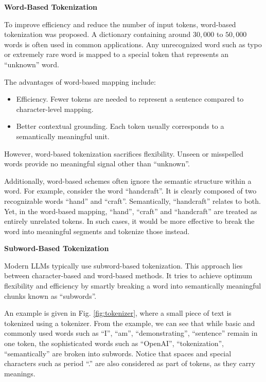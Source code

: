\vspace{0.1in}
\noindent \textbf{Word-Based Tokenization}
\vspace{0.1in}

To improve efficiency and reduce the number of input tokens, word-based tokenization was proposed. A dictionary containing around $30{,}000$ to $50{,}000$ words is often used in common applications. Any unrecognized word such as typo or extremely rare word is mapped to a special token that represents an ``unknown'' word.

The advantages of word-based mapping include:
\begin{itemize}
	\item Efficiency. Fewer tokens are needed to represent a sentence compared to character-level mapping.
	\item Better contextual grounding. Each token usually corresponds to a semantically meaningful unit.
\end{itemize}

However, word-based tokenization sacrifices flexibility. Unseen or misspelled words provide no meaningful signal other than ``unknown''. 

Additionally, word-based schemes often ignore the semantic structure within a word. For example, consider the word ``handcraft''. It is clearly composed of two recognizable words ``hand'' and ``craft''. Semantically, ``handcraft'' relates to both. Yet, in the word-based mapping, ``hand'', ``craft'' and ``handcraft'' are treated as entirely unrelated tokens. In such cases, it would be more effective to break the word into meaningful segments and tokenize those instead.

\vspace{0.1in}
\noindent \textbf{Subword-Based Tokenization}
\vspace{0.1in}

Modern LLMs typically use subword-based tokenization. This approach lies between character-based and word-based methods. It tries to achieve optimum flexibility and efficiency by smartly breaking a word into semantically meaningful chunks known as ``subwords''.

An example is given in Fig. \ref{fig:tokenizer}, where a small piece of text is tokenized using a tokenizer. From the example, we can see that while basic and commonly used words such as ``I'', ``am'', ``demonstrating'', ``sentence'' remain in one token, the sophisticated words such as ``OpenAI'', ``tokenization'', ``semantically'' are broken into subwords. Notice that spaces and special characters such as period ``.'' are also considered as part of tokens, as they carry meanings.

